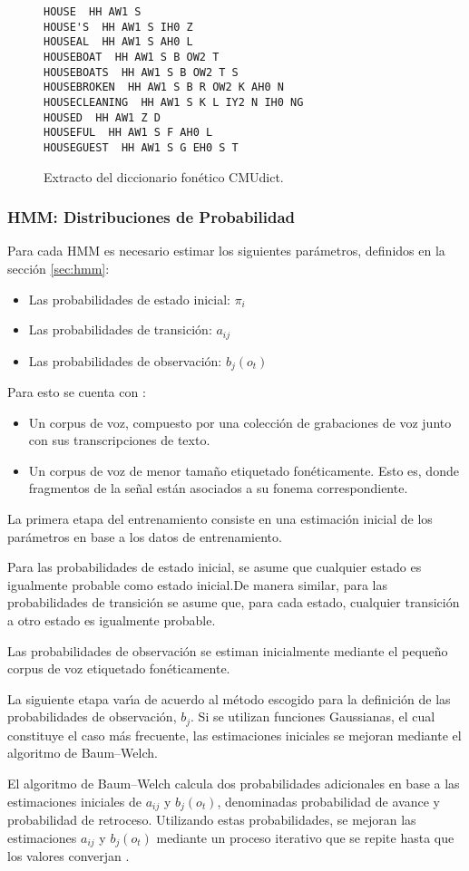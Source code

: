 \begin{figure}[H]
\begin{lstlisting}
HOUSE  HH AW1 S
HOUSE'S  HH AW1 S IH0 Z
HOUSEAL  HH AW1 S AH0 L
HOUSEBOAT  HH AW1 S B OW2 T
HOUSEBOATS  HH AW1 S B OW2 T S
HOUSEBROKEN  HH AW1 S B R OW2 K AH0 N
HOUSECLEANING  HH AW1 S K L IY2 N IH0 NG
HOUSED  HH AW1 Z D
HOUSEFUL  HH AW1 S F AH0 L
HOUSEGUEST  HH AW1 S G EH0 S T
\end{lstlisting}
\caption{Extracto del diccionario fon\'etico CMUdict.}
\end{figure}

\subsubsection{HMM: Distribuciones de Probabilidad}
Para cada HMM es necesario estimar los siguientes par\'ametros, definidos en la secci\'on \ref{sec:hmm}:
	\begin{itemize}
		\item Las probabilidades de estado inicial: $\pi_i$
		\item Las probabilidades de transici\'on: $a_{ij}$
		\item Las probabilidades de observaci\'on: $b_j(o_t)$ 
	\end{itemize}

Para esto se cuenta con \cite{Jurafsky}:
	\begin{itemize}
		\item  Un corpus de voz, compuesto por una colecci\'on de grabaciones de voz junto
		con sus transcripciones de texto.
		\item Un corpus de voz de menor tama\~no etiquetado fon\'eticamente. 
		Esto es, donde fragmentos de la se\~nal est\'an asociados a su fonema correspondiente.
	\end{itemize}

La primera etapa del entrenamiento consiste en una estimaci\'on inicial de los par\'ametros en base a los
datos de entrenamiento.

Para las probabilidades de estado inicial, se asume que cualquier estado es igualmente probable 
como estado inicial.De manera similar, para las probabilidades de transici\'on se asume que, para cada estado, cualquier transici\'on a otro estado es igualmente probable.

Las probabilidades de observaci\'on se estiman inicialmente mediante el peque\~no corpus 
de voz etiquetado fon\'eticamente.

La siguiente etapa var{\'\i}a de acuerdo al m\'etodo escogido para la definici\'on de las probabilidades
de observaci\'on, $b_j$. Si se utilizan funciones Gaussianas, el cual constituye el caso m\'as
frecuente, las estimaciones iniciales se mejoran mediante el algoritmo de Baum--Welch.

El algoritmo de Baum--Welch calcula dos probabilidades adicionales en base a las estimaciones
iniciales de $a_{ij}$ y $b_j(o_t)$, denominadas probabilidad de avance y probabilidad de retroceso. 
Utilizando estas probabilidades, se mejoran las estimaciones $a_{ij}$ y $b_j(o_t)$ mediante
un proceso iterativo que se repite hasta que los valores converjan \cite{Rabiner89atutorial}.